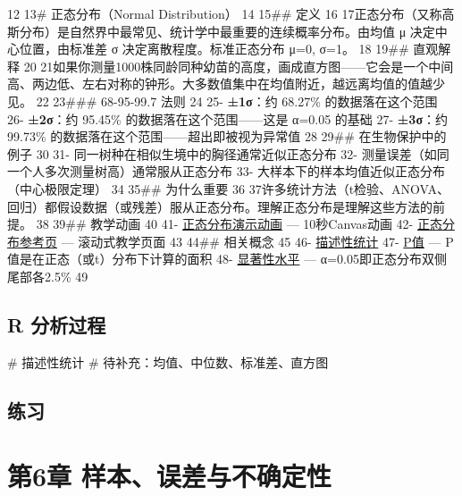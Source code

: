 \documentclass[
  letterpaper,
]{scrbook}
\newenvironment{Shaded}{\begin{snugshade}}{\end{snugshade}}
\newcommand{\CommentTok}[1]{\textcolor[rgb]{0.37,0.37,0.37}{#1}}
\begin{document}
12\textbar{} 13\textbar\# 正态分布（Normal Distribution） 14\textbar{}
15\textbar\#\# 定义 16\textbar{}
17\textbar 正态分布（又称高斯分布）是自然界中最常见、统计学中最重要的连续概率分布。由均值
μ 决定中心位置，由标准差 σ 决定离散程度。标准正态分布 μ=0, σ=1。
18\textbar{} 19\textbar\#\# 直观解释 20\textbar{}
21\textbar 如果你测量1000株同龄同种幼苗的高度，画成直方图------它会是一个中间高、两边低、左右对称的钟形。大多数值集中在均值附近，越远离均值的值越少见。
22\textbar{} 23\textbar\#\#\# 68-95-99.7 法则 24\textbar{} 25\textbar-
\textbf{±1σ}：约 68.27\% 的数据落在这个范围 26\textbar- \textbf{±2σ}：约
95.45\% 的数据落在这个范围------这是 α=0.05 的基础 27\textbar-
\textbf{±3σ}：约 99.73\% 的数据落在这个范围------超出即被视为异常值
28\textbar{} 29\textbar\#\# 在生物保护中的例子 30\textbar{} 31\textbar-
同一树种在相似生境中的胸径通常近似正态分布 32\textbar-
测量误差（如同一个人多次测量树高）通常服从正态分布 33\textbar-
大样本下的样本均值近似正态分布（中心极限定理） 34\textbar{}
35\textbar\#\# 为什么重要 36\textbar{}
37\textbar 许多统计方法（t检验、ANOVA、回归）都假设数据（或残差）服从正态分布。理解正态分布是理解这些方法的前提。
38\textbar{} 39\textbar\#\# 教学动画 40\textbar{} 41\textbar-
\href{../animation-scripts/normal-distribution-animation.md}{正态分布演示动画}
--- 10秒Canvas动画 42\textbar-
\href{../animation-scripts/normal-distribution-reference.md}{正态分布参考页}
--- 滚动式教学页面 43\textbar{} 44\textbar\#\# 相关概念 45\textbar{}
46\textbar- \href{descriptive-statistics.md}{描述性统计} 47\textbar-
\href{p-value.md}{P值} --- P值是在正态（或t）分布下计算的面积
48\textbar- \href{significance-level.md}{显著性水平} ---
α=0.05即正态分布双侧尾部各2.5\% 49\textbar{}

\section{R 分析过程}\label{r-ux5206ux6790ux8fc7ux7a0b-1}

\begin{Shaded}
\begin{Highlighting}[]
\CommentTok{\# 描述性统计}
\CommentTok{\# 待补充：均值、中位数、标准差、直方图}
\end{Highlighting}
\end{Shaded}

\section{练习}\label{ux7ec3ux4e60-4}

\chapter{第6章
样本、误差与不确定性}\label{ux7b2c6ux7ae0-ux6837ux672cux8befux5deeux4e0eux4e0dux786eux5b9aux6027}
\end{document}
